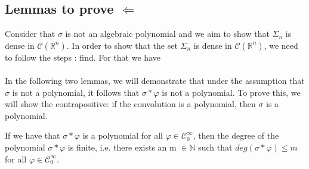 \documentclass[../main.tex]{subfiles}
\begin{document}
	\subsection{Lemmas to prove  $\Leftarrow$ }
	\noindent Consider that $\sigma$ is not an algebraic polynomial and we aim to show that $\Sigma_n$ is dense in $\mathcal{C}(\mathbb{R}^n)$. In order to show that the set $\Sigma_n $ is dense in $\mathcal{C}(\mathbb{R}^n)$, we need to follow the steps : find. For that we have \\  \\ 
	\noindent In the following two lemmas, we will demonstrate that under the assumption that $\sigma$ is not a polynomial, it follows that $\sigma \ast \varphi$ is not a polynomial. To prove this, we will show the contrapositive: if the convolution is a polynomial, then $\sigma$ is a polynomial. 
	\begin{lema}  %
		If we have that $\sigma \ast \varphi $ is a polynomial for all $\varphi \in \mathcal{C}^\infty_0 $, then the degree of the polynomial $\sigma \ast \varphi $ is finite, i.e. there exists an m $\in \mathbb{N}$ such that $ deg (\sigma \ast \varphi) \leq m$ for all $\varphi \in \mathcal{C}^\infty_0$. 
	\end{lema}
\end{document}
